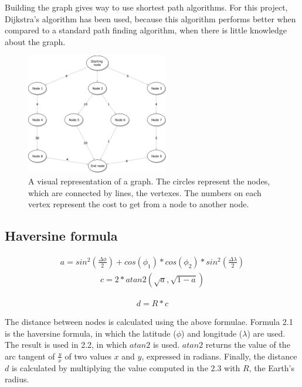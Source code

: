 Building the graph gives way to use shortest path algorithms. For this project, Dijkstra's algorithm has been used, because this algorithm performs better when compared to a standard path finding algorithm, when there is little knowledge about the graph.

\begin{figure}[H]
    \centering
    \includegraphics[width=235px, height=200px]{Background/graph.png}
    \centering
    \caption{A visual representation of a  graph. The circles represent the nodes, which are connected by lines, the vertexes. The numbers on each vertex represent the cost to get from a node to another node.}
    \label{fig:graph}
\end{figure}

\subsection{Haversine formula}
\label{sec:haversine}

\begin{align}
    a = sin^{2}(\frac{\Delta\phi}{2}) + cos(\phi_1) * cos(\phi_2) * sin^{2}(\frac{\Delta\lambda}{2})
\end{align}
\begin{align}
    c = 2 * atan2(\sqrt{a}, \sqrt{1-a})
\end{align}
    
\begin{align}
    d = R * c
\end{align}

The distance between nodes is calculated using the above formulae. Formula 2.1 is the haversine formula, in which the latitude ($\phi$) and longitude ($\lambda$) are used. The result is used in 2.2, in which $atan2$ is used. $atan2$ returns the value of the arc tangent of $\frac{y}{x}$ of two values $x$ and $y$, expressed in radians. Finally, the distance $d$ is calculated by multiplying the value computed in the 2.3 with $R$, the Earth's radius.

